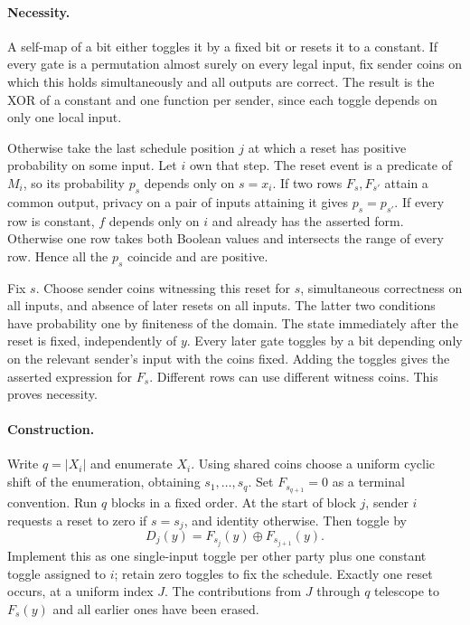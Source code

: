 \documentclass[11pt]{article}
\begin{document}
\paragraph{Necessity.}
A self-map of a bit either toggles it by a fixed bit or resets it to a constant. If every gate is a permutation almost surely on every legal input, fix sender coins on which this holds simultaneously and all outputs are correct. The result is the XOR of a constant and one function per sender, since each toggle depends on only one local input.

Otherwise take the last schedule position $j$ at which a reset has positive probability on some input. Let $i$ own that step. The reset event is a predicate of $M_i$, so its probability $p_s$ depends only on $s=x_i$. If two rows $F_s,F_{s'}$ attain a common output, privacy on a pair of inputs attaining it gives $p_s=p_{s'}$. If every row is constant, $f$ depends only on $i$ and already has the asserted form. Otherwise one row takes both Boolean values and intersects the range of every row. Hence all the $p_s$ coincide and are positive.

Fix $s$. Choose sender coins witnessing this reset for $s$, simultaneous correctness on all inputs, and absence of later resets on all inputs. The latter two conditions have probability one by finiteness of the domain. The state immediately after the reset is fixed, independently of $y$. Every later gate toggles by a bit depending only on the relevant sender's input with the coins fixed. Adding the toggles gives the asserted expression for $F_s$. Different rows can use different witness coins. This proves necessity.

\paragraph{Construction.}
Write $q=|X_i|$ and enumerate $X_i$. Using shared coins choose a uniform cyclic shift of the enumeration, obtaining $s_1,\ldots,s_q$. Set $F_{s_{q+1}}=0$ as a terminal convention. Run $q$ blocks in a fixed order. At the start of block $j$, sender $i$ requests a reset to zero if $s=s_j$, and identity otherwise. Then toggle by
\[
 D_j(y)=F_{s_j}(y)\oplus F_{s_{j+1}}(y).
\]
Implement this as one single-input toggle per other party plus one constant toggle assigned to $i$; retain zero toggles to fix the schedule. Exactly one reset occurs, at a uniform index $J$. The contributions from $J$ through $q$ telescope to $F_s(y)$ and all earlier ones have been erased.
\end{document}
